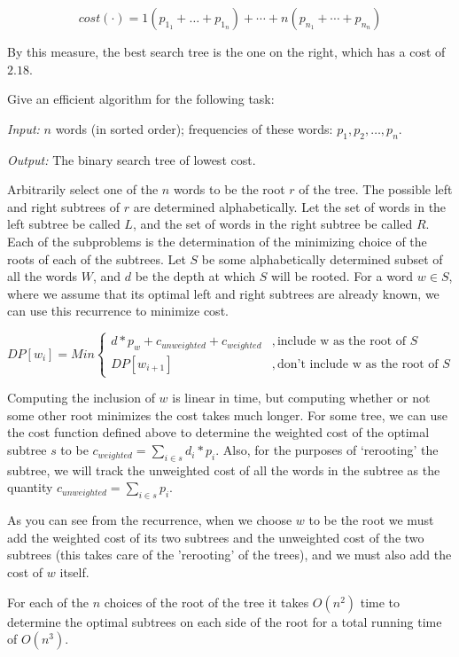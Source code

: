 \documentclass[11pt]{article}
\begin{document}
$$ cost(\cdot) = 1(p_{1_1}+\ldots+p_{1_n}) + \cdots + n(p_{n_1}+\cdots+p_{n_n})$$

By this measure, the best search tree is the one on the right, which has a cost of $2.18$. 

Give an efficient algorithm for the following task:

\emph{Input:} $n$ words (in sorted order); frequencies of these words: $p_1,p_2,\ldots,p_n$.

\emph{Output:} The binary search tree of lowest cost.

Arbitrarily select one of the $n$ words to be the root $r$  of the tree.
The possible left and right subtrees of $r$ are determined alphabetically.
Let the set of words in the left subtree be called $L$, and the set of words in the
right subtree be called $R$. Each of the subproblems is the determination of the minimizing choice
of the roots of each of the subtrees. Let  $S$ be some alphabetically determined
subset of all the words $W$, and $d$ be the depth at which $S$ will be rooted. 
For a word $w \in S$, where we assume that its optimal left and right subtrees are already known,
 we can use this recurrence to minimize cost. 

\begin{displaymath}
   DP[w_i] = Min  \left\{
     \begin{array}{lr}
      d*p_w + c_{unweighted} + c_{weighted}  &,\mbox{include w as the root of $S$}\\
      DP[w_{i+1}]  &,\mbox{don't include w as the root of $S$}
     \end{array}
   \right.
\end{displaymath}

Computing the inclusion of $w$ is linear in time, but computing whether or not some other root minimizes the cost takes much longer.
For some tree, we can use the cost function defined above to determine the weighted cost
of the optimal subtree $s$ to be $c_{weighted}= \sum_{i\in s}d_i*p_i$.  
Also, for the purposes of `rerooting' the subtree, we will track the unweighted cost of all the
words in the subtree as the quantity $c_{unweighted}=\sum_{i\in s}p_i$. 

As you can see from the recurrence, when we choose $w$ to be the root we must add the weighted cost of
its two subtrees and the unweighted cost of the two subtrees (this takes care of the 'rerooting' of the trees),
and we must also add the cost of $w$ itself. 

For each of the $n$ choices of the root of the tree it takes $O(n^2)$ time to determine the optimal subtrees on each
side of the root for a total running time of $O(n^3)$.
\end{document}
